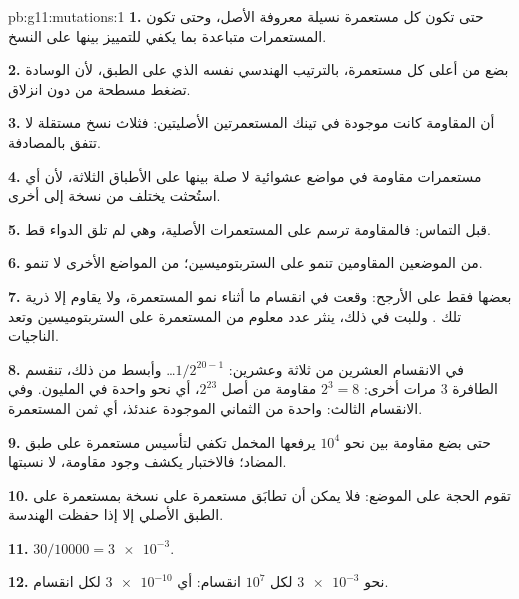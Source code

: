 \begin{solution}{pb:g11:mutations:1}
\textbf{1.} حتى تكون كل مستعمرة نسيلة معروفة الأصل، وحتى تكون
المستعمرات متباعدة بما يكفي للتمييز بينها على النسخ.

\textbf{2.} بضع  من أعلى كل مستعمرة، بالترتيب الهندسي نفسه الذي
على الطبق، لأن الوسادة تضغط مسطحة من دون انزلاق.

\textbf{3.} أن  المقاومة كانت موجودة في تينك المستعمرتين
الأصليتين: فثلاث نسخ مستقلة لا تتفق بالمصادفة.

\textbf{4.} مستعمرات مقاومة في مواضع عشوائية لا صلة بينها على الأطباق
الثلاثة، لأن أي  استُحثت يختلف من نسخة إلى أخرى.

\textbf{5.}  قبل التماس: فالمقاومة ترسم على المستعمرات الأصلية،
وهي لم تلق الدواء قط.

\textbf{6.}  من الموضعين المقاومين تنمو على الستربتوميسين؛
 من المواضع الأخرى لا تنمو.

\textbf{7.} بعضها فقط على الأرجح:  وقعت في انقسام ما أثناء نمو
المستعمرة، ولا يقاوم إلا ذرية تلك . وللبت في ذلك، ينثر عدد معلوم
من  المستعمرة على الستربتوميسين وتعد الناجيات.

\textbf{8.} في الانقسام العشرين من ثلاثة وعشرين: $1/2^{20-1}$\dots
وأبسط من ذلك، تنقسم  الطافرة 3 مرات أخرى: $2^3 = 8$  مقاومة
من أصل $2^{23}$، أي نحو واحدة في المليون. وفي الانقسام الثالث: واحدة
من  الثماني الموجودة عندئذ، أي ثمن المستعمرة.

\textbf{9.} حتى بضع  مقاومة بين نحو $10^4$  يرفعها المخمل
تكفي لتأسيس مستعمرة على طبق المضاد؛ فالاختبار يكشف وجود  مقاومة،
لا نسبتها.

\textbf{10.} تقوم الحجة على الموضع: فلا يمكن أن تطابَق مستعمرة على
نسخة بمستعمرة على الطبق الأصلي إلا إذا حفظت الهندسة.

\textbf{11.} $30/\num{10000} = \num{3e-3}$.

\textbf{12.} نحو $\num{3e-3}$  لكل $10^7$ انقسام:
أي $\num{3e-10}$ لكل انقسام.


\end{solution}
